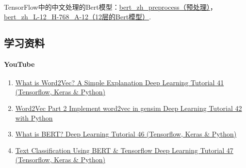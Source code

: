 \documentclass[
]{article}
\begin{document}
TensorFlow中的中文处理的Bert模型：\href{https://tfhub.dev/tensorflow/bert_zh_preprocess/3}{bert\_zh\_preprocess（预处理）}，\href{https://tfhub.dev/tensorflow/bert_zh_L-12_H-768_A-12/4}{bert\_zh\_L-12\_H-768\_A-12（12层的Bert模型）}.

\hypertarget{ux5b66ux4e60ux8d44ux6599}{%
\subsection{学习资料}\label{ux5b66ux4e60ux8d44ux6599}}

\hypertarget{youtube}{%
\paragraph{YouTube}\label{youtube}}

\begin{enumerate}
\def\labelenumi{\arabic{enumi}.}
\item
  \href{https://www.youtube.com/watch?v=hQwFeIupNP0\&list=RDCMUCh9nVJoWXmFb7sLApWGcLPQ\&start_radio=1\&rv=hQwFeIupNP0\&t=4}{What
  is Word2Vec? A Simple Explanation \textbar{} Deep Learning Tutorial 41
  (Tensorflow, Keras \& Python)}
\item
  \href{https://www.youtube.com/watch?v=Q2NtCcqmIww}{Word2Vec Part 2
  \textbar{} Implement word2vec in gensim \textbar{} \textbar{} Deep
  Learning Tutorial 42 with Python}
\item
  \href{https://www.youtube.com/watch?v=7kLi8u2dJz0\&t=799s}{What is
  BERT? \textbar{} Deep Learning Tutorial 46 (Tensorflow, Keras \&
  Python)}
\item
  \href{https://www.youtube.com/watch?v=hOCDJyZ6quA}{Text Classification
  Using BERT \& Tensorflow \textbar{} Deep Learning Tutorial 47
  (Tensorflow, Keras \& Python)}
\end{enumerate}
\end{document}
